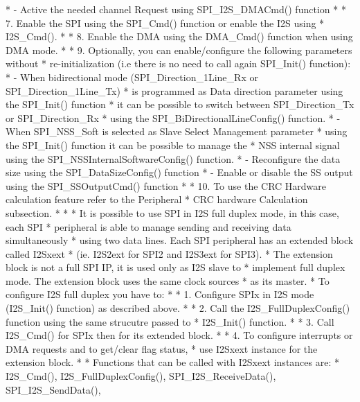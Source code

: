 \begin{DoxyVerb}
*                   - Active the needed channel Request using SPI_I2S_DMACmd() function
* 
*          7. Enable the SPI using the SPI_Cmd() function or enable the I2S using
*             I2S_Cmd().
* 
*          8. Enable the DMA using the DMA_Cmd() function when using DMA mode. 
*
*          9. Optionally, you can enable/configure the following parameters without
*             re-initialization (i.e there is no need to call again SPI_Init() function):
*              - When bidirectional mode (SPI_Direction_1Line_Rx or SPI_Direction_1Line_Tx)
*                is programmed as Data direction parameter using the SPI_Init() function
*                it can be possible to switch between SPI_Direction_Tx or SPI_Direction_Rx
*                using the SPI_BiDirectionalLineConfig() function.
*              - When SPI_NSS_Soft is selected as Slave Select Management parameter 
*                using the SPI_Init() function it can be possible to manage the 
*                NSS internal signal using the SPI_NSSInternalSoftwareConfig() function.
*              - Reconfigure the data size using the SPI_DataSizeConfig() function  
*              - Enable or disable the SS output using the SPI_SSOutputCmd() function  
*          
*          10. To use the CRC Hardware calculation feature refer to the Peripheral 
*              CRC hardware Calculation subsection.
*   
*
*          It is possible to use SPI in I2S full duplex mode, in this case, each SPI 
*          peripheral is able to manage sending and receiving data simultaneously
*          using two data lines. Each SPI peripheral has an extended block called I2Sxext
*          (ie. I2S2ext for SPI2 and I2S3ext for SPI3).
*          The extension block is not a full SPI IP, it is used only as I2S slave to
*          implement full duplex mode. The extension block uses the same clock sources
*          as its master.          
*          To configure I2S full duplex you have to:
*            
*          1. Configure SPIx in I2S mode (I2S_Init() function) as described above. 
*           
*          2. Call the I2S_FullDuplexConfig() function using the same strucutre passed to  
*             I2S_Init() function.
*            
*          3. Call I2S_Cmd() for SPIx then for its extended block.
*          
*          4. To configure interrupts or DMA requests and to get/clear flag status, 
*             use I2Sxext instance for the extension block.
*             
*          Functions that can be called with I2Sxext instances are:
*          I2S_Cmd(), I2S_FullDuplexConfig(), SPI_I2S_ReceiveData(), SPI_I2S_SendData(), 

\end{DoxyVerb}
